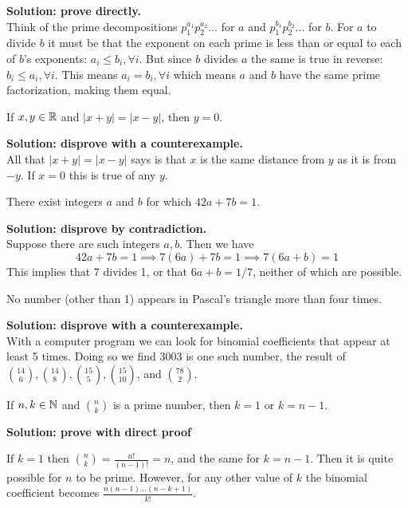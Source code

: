 \documentclass{article}
\begin{document}
\textbf{Solution: prove directly.}
\\

Think of the prime decompositions $p_1^{a_1}p_2^{a_2}\ldots$ for $a$ and $p_1^{b_1}p_2^{b_2}\ldots$ for $b$. For $a$ to divide $b$ it must be that the exponent on each prime is less than or equal to each of $b$'s exponents: $a_i \leq b_i, \forall i$. But since $b$ divides $a$ the same is true in reverse: $b_i \leq a_i, \forall i$. This means $a_i = b_i, \forall i$ which means $a$ and $b$ have the same prime factorization, making them equal.

\begin{problem}
If $x, y \in \mathbb{R}$ and $|x + y| = |x - y|$, then $y = 0$.
\end{problem}

\textbf{Solution: disprove with a counterexample.}
\\

All that $|x + y| = |x -y|$ says is that $x$ is the same distance from $y$ as it is from $-y$. If $x = 0$ this is true of any $y$.

\begin{problem}
There exist integers $a$ and $b$ for which $42a + 7b = 1$.
\end{problem}
\textbf{Solution: disprove by contradiction.}
\\

Suppose there are such integers $a, b$. Then we have
$$42a + 7b = 1 \implies 7(6a) + 7b = 1 \implies 7(6a + b) = 1$$
This implies that 7 divides 1, or that $6a + b = 1/7$, neither of which are possible.

\begin{problem}
No number (other than 1) appears in Pascal's triangle more than four times.
\end{problem}
\textbf{Solution: disprove with a counterexample.}
\\

With a computer program we can look for binomial coefficients that appear at least 5 times. Doing so we find 3003 is one such number, the result of $\binom{14}{6}, \binom{14}{8}, \binom{15}{5}, \binom{15}{10}$, and $\binom{78}{2}$.

\begin{problem}
If $n, k \in \mathbb{N}$ and $\binom{n}{k}$ is a prime number, then $k = 1$ or $k = n - 1$.
\end{problem}

\textbf{Solution: prove with direct proof}

If $k = 1$ then $\binom{n}{k} = \frac{n!}{(n-1)!} = n$, and the same for $k = n - 1$. Then it is quite possible for $n$ to be prime. However, for any other value of $k$ the binomial coefficient becomes $\frac{n(n-1)\ldots(n-k+1)}{k!}$.
\end{document}
